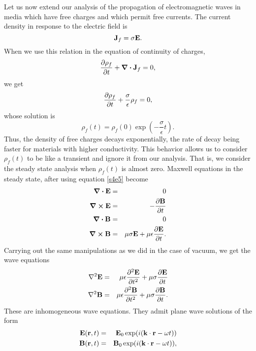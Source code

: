 \documentclass[11pt]{article}
\numberwithin{equation}{section}
\begin{document}
Let us now extend our analysis of the propagation of electromagnetic waves
in media which have free charges and which permit free currents. The current
density in response to the electric field is
\begin{equation}\label{s4e5}
\vb{J}_f = \sigma\vb{E}.
\end{equation}
When we use this relation in the equation of continuity of charges,
\begin{equation}\label{s4e6}
\pdv{\rho_f}{t} + \div\vb{J}_f = 0,
\end{equation}
we get
\begin{equation}\label{s4e7}
\pdv{\rho_f}{t} + \frac{\sigma}{\epsilon}\rho_f = 0,
\end{equation}
whose solution is
\begin{equation}\label{s4e8}
\rho_f(t) = \rho_f(0)\exp\left(-\frac{\sigma}{\epsilon}t\right).
\end{equation}
Thus, the density of free charges decays exponentially, the rate of decay being
faster for materials with higher conductivity. This behavior allows us to
consider $\rho_f(t)$ to be like a transient and ignore it from our analysis.
That is, we consider the steady state analysis when $\rho_f(t)$ is almost
zero. Maxwell equations in the steady state, after using equation \eqref{s4e5}
become
\begin{eqnarray}
\div\vb{E} &=& 0 \label{s4e9} \\
\curl\vb{E} &=& -\pdv{\vb{B}}{t} \label{s4e10} \\
\div\vb{B} &=& 0 \label{s4e11} \\
\curl\vb{B} &=& \mu\sigma\vb{E} + \mu\epsilon\pdv{\vb{E}}{t}. \label{s4e12}
\end{eqnarray}
Carrying out the same manipulations as we did in the case of vacuum, we get
the wave equations
\begin{eqnarray}
\laplacian\vb{E} &=& \mu\epsilon\pdv[2]{\vb{E}}{t} + \mu\sigma\pdv{\vb{E}}{t}
\label{s4e13} \\
\laplacian\vb{B} &=& \mu\epsilon\pdv[2]{\vb{B}}{t} + \mu\sigma\pdv{\vb{B}}{t}.
\label{s4e14} 
\end{eqnarray}
These are inhomogeneous wave equations. They admit plane wave solutions of
the form
\begin{eqnarray}
\vb{E}(\vb{r}, t) &=& \vb{E}_0\exp(i(\vb{k}\cdot\vb{r} - \omega t))
\label{s4e15} \\
\vb{B}(\vb{r}, t) &=& \vb{B}_0\exp(i(\vb{k}\cdot\vb{r} - \omega t)),
\label{s4e16} 
\end{eqnarray}
\end{document}
